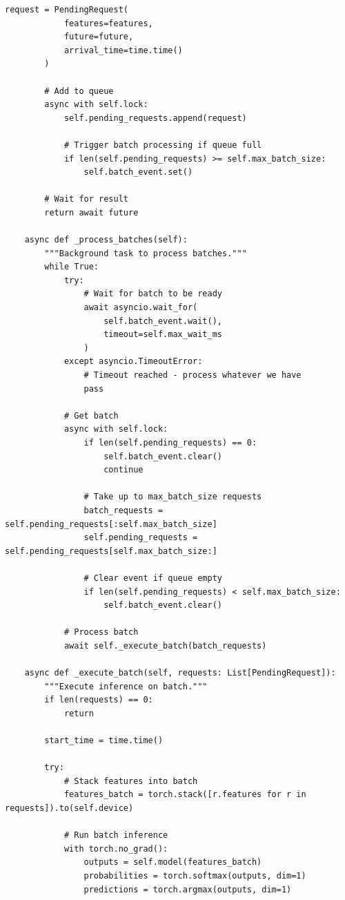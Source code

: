 \begin{lstlisting}[style=python, caption=Dynamic batch serving for throughput optimization]
        request = PendingRequest(
            features=features,
            future=future,
            arrival_time=time.time()
        )

        # Add to queue
        async with self.lock:
            self.pending_requests.append(request)

            # Trigger batch processing if queue full
            if len(self.pending_requests) >= self.max_batch_size:
                self.batch_event.set()

        # Wait for result
        return await future

    async def _process_batches(self):
        """Background task to process batches."""
        while True:
            try:
                # Wait for batch to be ready
                await asyncio.wait_for(
                    self.batch_event.wait(),
                    timeout=self.max_wait_ms
                )
            except asyncio.TimeoutError:
                # Timeout reached - process whatever we have
                pass

            # Get batch
            async with self.lock:
                if len(self.pending_requests) == 0:
                    self.batch_event.clear()
                    continue

                # Take up to max_batch_size requests
                batch_requests = self.pending_requests[:self.max_batch_size]
                self.pending_requests = self.pending_requests[self.max_batch_size:]

                # Clear event if queue empty
                if len(self.pending_requests) < self.max_batch_size:
                    self.batch_event.clear()

            # Process batch
            await self._execute_batch(batch_requests)

    async def _execute_batch(self, requests: List[PendingRequest]):
        """Execute inference on batch."""
        if len(requests) == 0:
            return

        start_time = time.time()

        try:
            # Stack features into batch
            features_batch = torch.stack([r.features for r in requests]).to(self.device)

            # Run batch inference
            with torch.no_grad():
                outputs = self.model(features_batch)
                probabilities = torch.softmax(outputs, dim=1)
                predictions = torch.argmax(outputs, dim=1)


\end{lstlisting}

